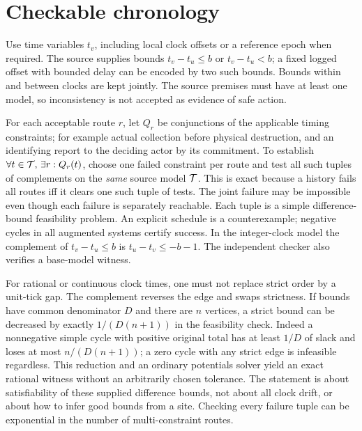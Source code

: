 \documentclass[11pt]{article}
\begin{document}
\section{Checkable chronology}
Use time variables \(t_v\), including local clock offsets or a
reference epoch when required. The source supplies bounds
\(t_v-t_u\leq b\) or \(t_v-t_u<b\); a fixed logged offset with
bounded delay can be encoded by two such bounds. Bounds within
and between clocks are kept jointly. The source premises must
have at least one model, so inconsistency is not accepted as
evidence of safe action.

For each acceptable route \(r\), let \(Q_r\) be conjunctions of
the applicable timing constraints; for example actual collection
before physical destruction, and an identifying report to the
deciding actor by its commitment. To establish
\(\forall t\in{\cal T},\,\exists r:Q_r(t)\), choose one failed
constraint per route and test all such tuples of complements on
the \emph{same} source model \({\cal T}\). This is exact because a
history fails all routes iff it clears one such tuple of tests.
The joint failure may be impossible even though each failure is
separately reachable. Each tuple is a simple difference-bound
feasibility problem. An explicit schedule is a counterexample;
negative cycles in all augmented systems certify success. In the
integer-clock model the complement of
\(t_v-t_u\leq b\) is \(t_u-t_v\leq-b-1\).
The independent checker also verifies a base-model witness.

For rational or continuous clock times, one must not replace
strict order by a unit-tick gap. The complement reverses the edge
and swaps strictness. If bounds have common denominator \(D\)
and there are \(n\) vertices, a strict bound can be decreased
by exactly \(1/(D(n+1))\) in the feasibility check. Indeed a
nonnegative simple cycle with positive original total has at
least \(1/D\) of slack and loses at most \(n/(D(n+1))\); a zero
cycle with any strict edge is infeasible regardless. This
reduction and an ordinary potentials solver yield an exact
rational witness without an arbitrarily chosen tolerance. The
statement is about satisfiability of these supplied difference
bounds, not about all clock drift, or about how to infer good
bounds from a site. Checking every failure tuple can be
exponential in the number of multi-constraint routes.
\end{document}
